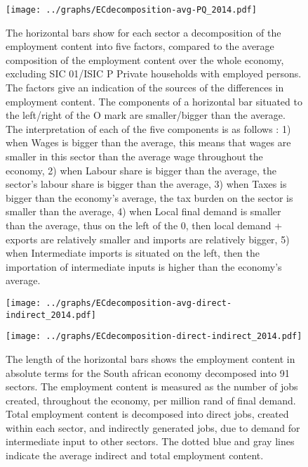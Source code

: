 \documentclass[12pt,english]{article}
\begin{document}
\begin{figure}[!ht]
	\centering
	\texttt{[image: ../graphs/ECdecomposition-avg-PQ\_2014.pdf]}
	\caption{\footnotesize \label{Decomposition_PQ}The horizontal bars show for each sector a decomposition of the employment content into five factors, compared to the average composition of the employment content over the whole economy, excluding SIC 01/ISIC P Private households with employed persons. The factors give an indication of the sources of the differences in employment content. The components of a horizontal bar situated to the left/right of the O mark are smaller/bigger than the average. The interpretation of each of the five components is as follows : 1) when Wages is bigger than the average, this means that wages are smaller in this sector than the average wage throughout the economy, 2) when Labour share is bigger than the average, the sector's labour share is bigger than the average, 3) when Taxes is bigger than the economy's average, the tax burden on the sector is smaller than the average, 4) when Local final demand is smaller than the average, thus on the left of the 0, then local demand + exports are relatively smaller and imports are relatively bigger, 5) when Intermediate imports is situated on the left, then the importation of intermediate inputs is higher than the economy's average.}
\end{figure}	

\begin{figure}[!ht]
	\centering
	\thispagestyle{empty}
		\texttt{[image: ../graphs/ECdecomposition-avg-direct-indirect\_2014.pdf]}
	\caption{\label{Decomposition_direct_indirect_avg}}
\end{figure}	



\begin{figure}[!ht]
	\centering
	\thispagestyle{empty}
		\texttt{[image: ../graphs/ECdecomposition-direct-indirect\_2014.pdf]}
	\caption{\label{Decomposition_direct_indirect_absolute} The length of the horizontal bars shows the employment content in absolute terms for the South african economy decomposed into 91 sectors. The employment content is measured as the number of jobs created, throughout the economy, per million rand of final demand. Total employment content is decomposed into direct jobs, created within each sector, and indirectly generated jobs, due to demand for intermediate input to other sectors. The dotted blue and gray lines indicate the average indirect and total employment content.}
\end{figure}	
\end{document}

